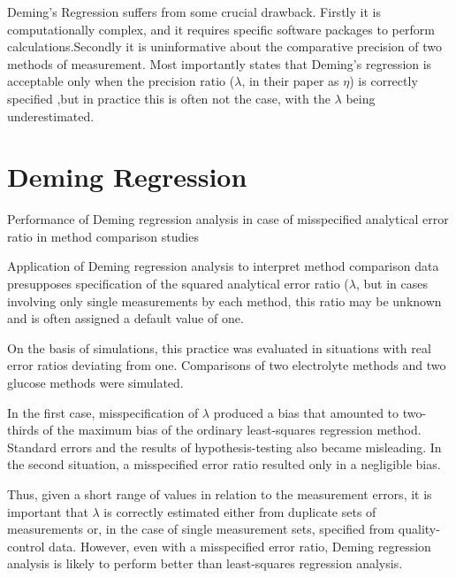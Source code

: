 \documentclass[MAIN.tex]{subfiles}
\begin{document}
	Deming's Regression suffers from some crucial drawback. Firstly it
	is computationally complex, and it requires specific software
	packages to perform calculations.Secondly it is uninformative
	about the comparative precision of two methods of measurement.
	Most importantly \citet{CarollRupert} states that Deming's
	regression is acceptable only when the precision ratio ($\lambda$,
	in their paper as $\eta$) is correctly specified ,but in practice
	this is often not the case, with the $\lambda$ being
	underestimated.
	\newpage
	
	

\section*{Deming Regression}

Performance of Deming regression analysis in case of misspecified analytical error ratio in method comparison studies

Application of Deming regression analysis to interpret method comparison data presupposes specification of the 
squared analytical error ratio ($\lambda$, but in cases involving only single measurements by each method, this 
ratio may be unknown and is often assigned a default value of one. 

On the basis of simulations, this practice was evaluated in situations with real error ratios deviating from one. 
Comparisons of two electrolyte methods and two glucose methods were simulated. 

In the first case, misspecification of $\lambda$ produced a bias that amounted to two-thirds of the maximum bias of the 
ordinary least-squares regression method. Standard errors and the results of hypothesis-testing also became misleading. 
In the second situation, a misspecified error ratio resulted only in a negligible bias. 

Thus, given a short range of values in relation to the measurement errors, it is important that $\lambda$ is correctly 
estimated either from duplicate sets of measurements or, in the case of single measurement sets, specified from 
quality-control data. However, even with a misspecified error ratio, Deming regression analysis is likely to perform 
better than least-squares regression analysis.
\end{document}
